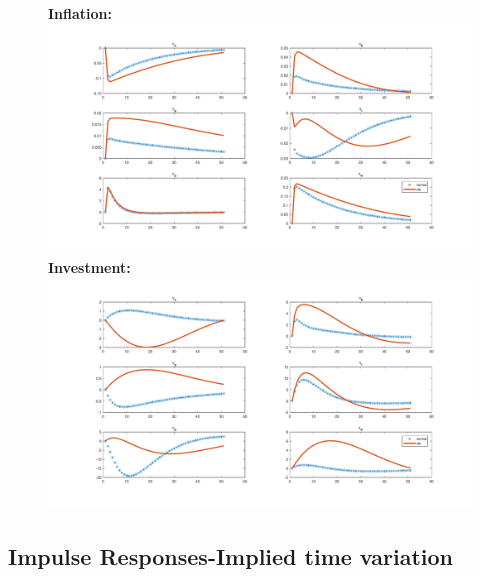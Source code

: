\documentclass[12pt,reqno]{article}
\numberwithin{equation}{section}
\begin{document}
\begin{figure}[H]
\textbf{Inflation:}\\
\includegraphics[scale=0.5]{rise_impresp_pinf.pdf}
\textbf{Investment:}\\
\includegraphics[scale=0.5]{rise_impresp_inve.pdf}
\end{figure}


\subsection*{Impulse Responses-Implied time variation}
\end{document}
